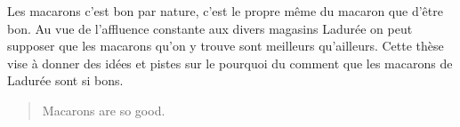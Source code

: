 
\begin{ResumeMotsCles}
\begin{resume}
Les macarons c'est bon par nature, c'est le propre même du macaron que d'être bon. Au vue de l'affluence constante aux divers magasins Ladurée on peut supposer que les macarons qu'on y trouve sont meilleurs qu'ailleurs. Cette thèse vise à donner des idées et pistes sur le pourquoi du comment que les macarons de Ladurée sont si bons.
\end{resume}

\begin{abstract}
Macarons are so good.
\end{abstract}

\end{ResumeMotsCles}
